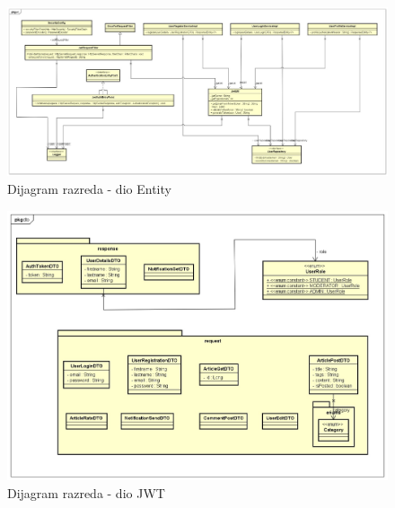 			\begin{figure}[H]
				\includegraphics[scale=0.4]{slike/DijagramRazreda5.jpg}
				\centering
				\caption{Dijagram razreda - dio Entity}
				\label{fig:class_diagram_entity}
			\end{figure}

			\eject

			\begin{figure}[H]
				\includegraphics[scale=0.4]{slike/DijagramRazreda6.jpg}
				\centering
				\caption{Dijagram razreda - dio JWT}
				\label{fig:class_diagram_jwt}
			\end{figure}

			\eject

			
			
			
			
		
			
